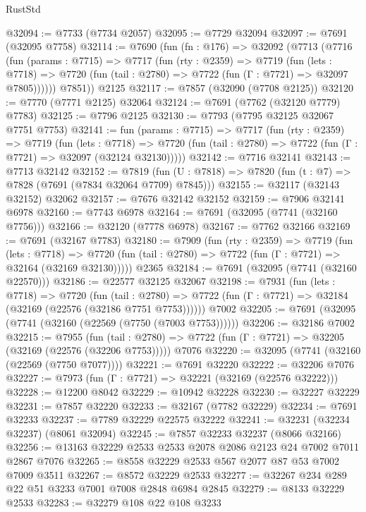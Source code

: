 \begin{lexlean}{RustStd}
\begin{coremodule}
@32094 := @7733 (@7734 @2057)
@32095 := @7729 @32094
@32097 := @7691 (@32095 @7758)
@32114 := @7690
    (fun (fn : @176) =>
    @32092
      (@7713
        (@7716
          (fun (params : @7715) =>
          @7717
            (fun (rty : @2359) =>
            @7719
              (fun (lets : @7718) =>
              @7720 (fun (tail : @2780) => @7722 (fun (Γ : @7721) => @32097 @7805))))))
        @7851))
    @2125
@32117 := @7857 (@32090 (@7708 @2125))
@32120 := @7770 (@7771 @2125) @32064
@32124 := @7691 (@7762 (@32120 @7779) @7783)
@32125 := @7796 @2125
@32130 := @7793 (@7795 @32125 @32067 @7751 @7753)
@32141 := fun (params : @7715) =>
  @7717
    (fun (rty : @2359) =>
    @7719
      (fun (lets : @7718) =>
      @7720 (fun (tail : @2780) => @7722 (fun (Γ : @7721) => @32097 (@32124 @32130)))))
@32142 := @7716 @32141
@32143 := @7713 @32142
@32152 := @7819
    (fun (U : @7818) => @7820 (fun (t : @7) => @7828 (@7691 (@7834 @32064 @7709) @7845)))
@32155 := @32117 (@32143 @32152) @32062
@32157 := @7676 @32142 @32152
@32159 := @7906 @32141 @6978
@32160 := @7743 @6978
@32164 := @7691 (@32095 (@7741 (@32160 @7756)))
@32166 := @32120 (@7778 @6978)
@32167 := @7762 @32166
@32169 := @7691 (@32167 @7783)
@32180 := @7909
    (fun (rty : @2359) =>
    @7719
      (fun (lets : @7718) =>
      @7720 (fun (tail : @2780) => @7722 (fun (Γ : @7721) => @32164 (@32169 @32130)))))
    @2365
@32184 := @7691 (@32095 (@7741 (@32160 @22570)))
@32186 := @22577 @32125 @32067
@32198 := @7931
    (fun (lets : @7718) =>
    @7720
      (fun (tail : @2780) =>
      @7722 (fun (Γ : @7721) => @32184 (@32169 (@22576 (@32186 @7751 @7753))))))
    @7002
@32205 := @7691 (@32095 (@7741 (@32160 (@22569 (@7750 (@7003 @7753))))))
@32206 := @32186 @7002
@32215 := @7955
    (fun (tail : @2780) => @7722 (fun (Γ : @7721) => @32205 (@32169 (@22576 (@32206 @7753)))))
    @7076
@32220 := @32095 (@7741 (@32160 (@22569 (@7750 @7077))))
@32221 := @7691 @32220
@32222 := @32206 @7076
@32227 := @7973 (fun (Γ : @7721) => @32221 (@32169 (@22576 @32222)))
@32228 := @12200 @8042
@32229 := @10942 @32228
@32230 := @32227 @32229
@32231 := @7857 @32220
@32233 := @32167 (@7782 @32229)
@32234 := @7691 @32233
@32237 := @7789 @32229 @22575 @32222
@32241 := @32231 (@32234 @32237) (@8061 @32094)
@32245 := @7857 @32233 @32237 (@8066 @32166)
@32256 := @13163 @32229 @2533 @2533 @2078 @2086 @2123 @24 @7002 @7011 @2867 @7076
@32265 := @8558 @32229 @2533 @567 @2077 @87 @53 @7002 @7009 @3511
@32267 := @8572 @32229 @2533
@32277 := @32267 @234 @289 @22 @51 @3233 @7001 @7008 @2848 @6984 @2845
@32279 := @8133 @32229 @2533
@32283 := @32279 @108 @22 @108 @3233

\end{coremodule}
\end{lexlean}
